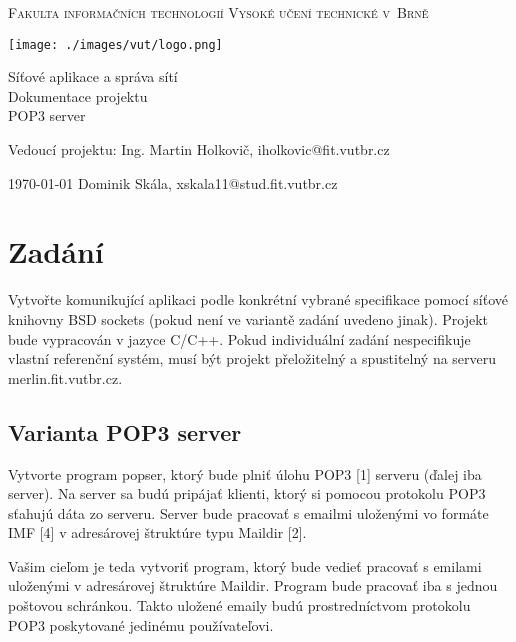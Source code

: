 \documentclass[11pt,a4paper]{report}
\makeatletter
\def\myauthor{Dominik Skála, xskala11@stud.fit.vutbr.cz}
\def\myleader{Vedoucí projektu:}
\def\myleadername{Ing. Martin Holkovič, iholkovic@fit.vutbr.cz}
\def\mytitle{Síťové aplikace a správa sítí \\ Dokumentace projektu}
\makeatother
\begin{document}
    \thispagestyle{empty}
    \begin{center}
        \Huge
        \textsc{Fakulta informačních technologií Vysoké učení technické v~Brně}

        \begin{center}
            \texttt{[image: ./images/vut/logo.png]}
        \end{center}
        \mytitle
        \\
        \LARGE POP3 server
    \end{center}

    {\Large
    \begin{flushleft}
        \myleader \hfill
        \myleadername
    \end{flushleft}
    \begin{flushright}
        \today \hfill
        \myauthor
    \end{flushright}}

    \clearpage

    \tableofcontents %

    \clearpage
    \section{Zadání}
    Vytvořte komunikující aplikaci podle konkrétní vybrané specifikace pomocí síťové knihovny BSD sockets (pokud není ve variantě zadání uvedeno jinak). Projekt bude vypracován v jazyce C/C++. Pokud individuální zadání nespecifikuje vlastní referenční systém, musí být projekt přeložitelný a spustitelný na serveru merlin.fit.vutbr.cz.
    \subsection{Varianta POP3 server}
    Vytvorte program popser, ktorý bude plniť úlohu POP3 [1] serveru (ďalej iba server). Na server sa budú pripájať klienti, ktorý si pomocou protokolu POP3 sťahujú dáta zo serveru. Server bude pracovať s emailmi uloženými vo formáte IMF [4] v adresárovej štruktúre typu Maildir [2].

    Vašim cieľom je teda vytvoriť program, ktorý bude vedieť pracovať s emilami uloženými v adresárovej štruktúre Maildir. Program bude pracovať iba s jednou poštovou schránkou. Takto uložené emaily budú prostredníctvom protokolu POP3 poskytované jedinému používateľovi.
\end{document}
